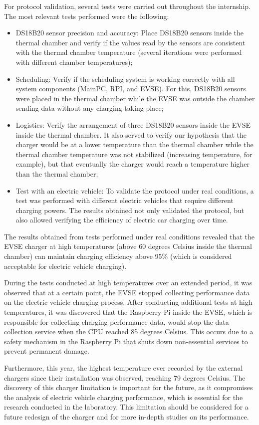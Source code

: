 For protocol validation, several tests were carried out throughout the internship. The most relevant tests performed were the following:
\begin{itemize}
    \item DS18B20 sensor precision and accuracy: Place DS18B20 sensors inside the thermal chamber and verify if the values read by the sensors are consistent with the thermal chamber temperature (several iterations were performed with different chamber temperatures);
    \item Scheduling: Verify if the scheduling system is working correctly with all system components (MainPC, RPI, and EVSE). For this, DS18B20 sensors were placed in the thermal chamber while the EVSE was outside the chamber sending data without any charging taking place;
    \item Logistics: Verify the arrangement of three DS18B20 sensors inside the EVSE inside the thermal chamber. It also served to verify our hypothesis that the charger would be at a lower temperature than the thermal chamber while the thermal chamber temperature was not stabilized (increasing temperature, for example), but that eventually the charger would reach a temperature higher than the thermal chamber;
    \item Test with an electric vehicle: To validate the protocol under real conditions, a test was performed with different electric vehicles that require different charging powers. The results obtained not only validated the protocol, but also allowed verifying the efficiency of electric car charging over time.
\end{itemize}

The results obtained from tests performed under real conditions revealed that the EVSE charger at high temperatures (above 60 degrees Celsius inside the thermal chamber) can maintain charging efficiency above 95\% (which is considered acceptable for electric vehicle charging).

During the tests conducted at high temperatures over an extended period, it was observed that at a certain point, the EVSE stopped collecting performance data on the electric vehicle charging process. After conducting additional tests at high temperatures, it was discovered that the Raspberry Pi inside the EVSE, which is responsible for collecting charging performance data, would stop the data collection service when the CPU reached 85 degrees Celsius. This occurs due to a safety mechanism in the Raspberry Pi that shuts down non-essential services to prevent permanent damage.

Furthermore, this year, the highest temperature ever recorded by the external chargers since their installation was observed, reaching 79 degrees Celsius. The discovery of this charger limitation is important for the future, as it compromises the analysis of electric vehicle charging performance, which is essential for the research conducted in the laboratory. This limitation should be considered for a future redesign of the charger and for more in-depth studies on its performance.